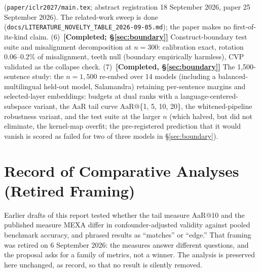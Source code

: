 \documentclass[11pt,a4paper]{article}
\begin{document}
(\texttt{paper/iclr2027/main.tex}; abstract registration 18 September 2026,
paper 25 September 2026). The related-work sweep is done
(\texttt{docs/LITERATURE\_NOVELTY\_TABLE\_2026-09-05.md}); the paper makes
no first-of-its-kind claim.
(6)~\textbf{[Completed; \S\ref{sec:boundary}]} Construct-boundary
test suite and misalignment decomposition at $n{=}300$: calibration exact, rotation
0.06--0.2\% of misalignment, teeth null (boundary empirically harmless),
CVP validated as the collapse check.
(7)~\textbf{[Completed, \S\ref{sec:boundary}]} The 1,500-sentence study: the $n{=}1{,}500$ re-embed over 14 models
(including a balanced-multilingual held-out model, Salamandra) retaining
per-sentence margins and selected-layer embeddings: budgets at dual ranks
with a language-centered-subspace variant, the AaR tail curve
AaR@\{1, 5, 10, 20\}, the whitened-pipeline robustness variant, and the
test suite at the larger $n$ (which halved, but did not eliminate, the
kernel-map overfit; the pre-registered prediction that it would vanish is
scored as failed for two of three models in \S\ref{sec:boundary}).

\appendix
\section{Record of Comparative Analyses (Retired Framing)}
\label{app:compar}
Earlier drafts of this report tested whether the tail measure AaR@10 and the
published measure MEXA differ in confounder-adjusted validity against pooled benchmark
accuracy, and phrased results as ``matches'' or ``edge.'' That framing was
retired on 6 September 2026: the measures answer different questions, and the
proposal asks for a family of metrics, not a winner. The analysis is preserved
here unchanged, as record, so that no result is silently removed.
\end{document}
